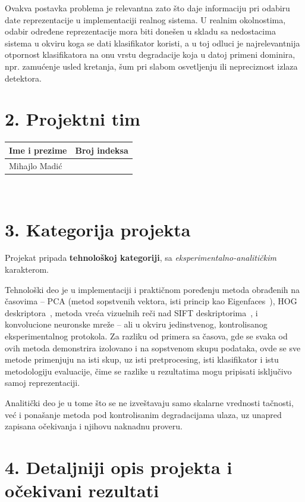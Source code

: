 \documentclass[11pt,a4paper]{article}
\begin{document}
Ovakva postavka problema je relevantna zato što daje informaciju pri odabiru date reprezentacije u implementaciji realnog sistema. U realnim okolnostima, odabir određene reprezentacije mora biti donešen u skladu sa nedostacima sistema u okviru koga se dati klasifikator koristi, a u toj odluci je najrelevantnija otpornost klasifikatora na onu vrstu degradacije koja u datoj primeni dominira, npr. zamućenje usled kretanja, šum pri slabom osvetljenju ili nepreciznost izlaza detektora.

\section*{2. Projektni tim}

\begin{tabular}{|>{\raggedright\arraybackslash}p{7cm}|>{\raggedright\arraybackslash}p{4cm}|}
\hline
\textbf{Ime i prezime} & \textbf{Broj indeksa} \\
\hline
Mihajlo Madić & 2119 \\
\hline
\end{tabular} \\

\newpage

\section*{3. Kategorija projekta}

Projekat pripada \textbf{tehnološkoj kategoriji}, sa \textit{eksperimentalno-analitičkim} karakterom.

Tehnološki deo je u implementaciji i praktičnom poređenju metoda obrađenih na časovima -- PCA (metod sopstvenih vektora, isti princip kao Eigenfaces~\cite{eigenfaces}), HOG deskriptora~\cite{hog}, metoda vreća vizuelnih reči nad SIFT deskriptorima~\cite{sift, bovw}, i konvolucione neuronske mreže -- ali u okviru jedinstvenog, kontrolisanog eksperimentalnog protokola. Za razliku od primera sa časova, gde se svaka od ovih metoda demonstrira izolovano i na sopstvenom skupu podataka, ovde se sve metode primenjuju na isti skup, uz isti pretprocesing, isti klasifikator i istu metodologiju evaluacije, čime se razlike u rezultatima mogu pripisati isključivo samoj reprezentaciji.

Analitički deo je u tome što se ne izveštavaju samo skalarne vrednosti tačnosti, već i ponašanje metoda pod kontrolisanim degradacijama ulaza, uz unapred zapisana očekivanja i njihovu naknadnu proveru.

\section*{4. Detaljniji opis projekta i očekivani rezultati}
\end{document}
